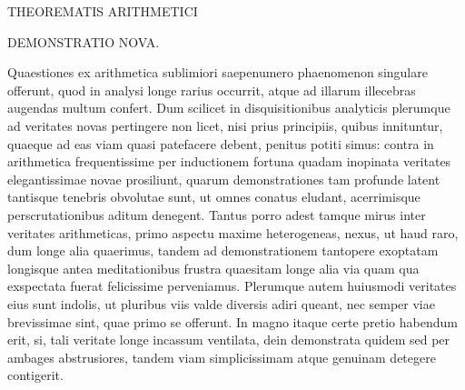 \begin{center}\Large THEOREMATIS ARITHMETICI\end{center}

\begin{center}\large DEMONSTRATIO NOVA.\end{center}

\BookRule{35mm}


Quaestiones ex arithmetica sublimiori saepenumero phaenomenon singulare offerunt, quod in analysi longe rarius occurrit, atque ad illarum illecebras augendas multum confert.  Dum scilicet in disquisitionibus analyticis plerumque ad veritates novas pertingere non licet, nisi prius principiis, quibus innituntur, quaeque ad eas viam quasi patefacere debent, penitus potiti simus: contra in arithmetica frequentissime per inductionem fortuna quadam inopinata veritates elegantissimae novae prosiliunt, quarum demonstrationes tam profunde latent tantisque tenebris obvolutae sunt, ut omnes conatus eludant, acerrimisque perscrutationibus aditum denegent.  Tantus porro adest tamque mirus inter veritates arithmeticas, primo aspectu maxime heterogeneas, nexus, ut haud raro, dum longe alia quaerimus, tandem ad demonstrationem tantopere exoptatam longisque antea meditationibus frustra quaesitam longe alia via quam qua exspectata fuerat felicissime perveniamus.  Plerumque autem huiusmodi veritates eius sunt indolis, ut pluribus viis valde diversis adiri queant, nec semper viae brevissimae sint, quae primo se offerunt.  In magno itaque certe pretio habendum erit, si, tali veritate longe incassum ventilata, dein demonstrata quidem sed per ambages abstrusiores, tandem viam simplicissimam atque genuinam detegere contigerit.


